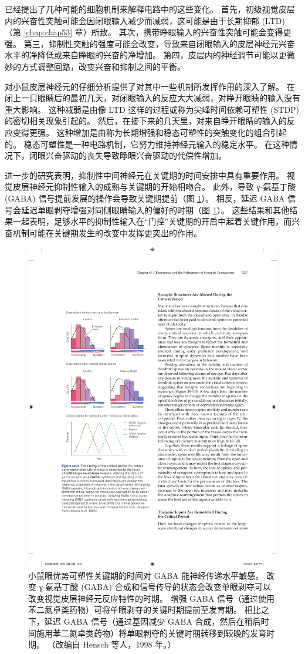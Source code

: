 已经提出了几种可能的细胞机制来解释电路中的这些变化。 首先，初级视觉皮层内的兴奋性突触可能会因闭眼输入减少而减弱，这可能是由于长期抑郁 (LTD)（第 \ref{chap:chap53} 章）所致。 其次，携带睁眼输入的兴奋性突触可能会变得更强。 第三，抑制性突触的强度可能会改变，导致来自闭眼输入的皮层神经元兴奋水平的净降低或来自睁眼的兴奋的净增加。 第四，皮层内的神经调节可能以更微妙的方式调整回路，改变兴奋和抑制之间的平衡。

对小鼠皮层神经元的仔细分析提供了对其中一些机制所发挥作用的深入了解。 在闭上一只眼睛后的最初几天，对闭眼输入的反应大大减弱，对睁开眼睛的输入没有重大影响。 这种减弱是由像 LTD 这样的过程或称为尖峰时间依赖可塑性 (STDP) 的密切相关现象引起的。 然后，在接下来的几天里，对来自睁开眼睛的输入的反应变得更强。 这种增加是由称为长期增强和稳态可塑性的突触变化的组合引起的。 稳态可塑性是一种电路机制，它努力维持神经元输入的稳定水平。 在这种情况下，闭眼兴奋驱动的丧失导致睁眼兴奋驱动的代偿性增加。

进一步的研究表明，抑制性中间神经元在关键期的时间安排中具有重要作用。 视觉皮层神经元抑制性输入的成熟与关键期的开始相吻合。 
此外，导致 γ-氨基丁酸 (GABA) 信号提前发展的操作会导致关键期提前（图 \ref{fig:49_9}）。
相反，延迟 GABA 信号会延迟单眼剥夺增强对同侧眼睛输入的偏好的时期（图 \ref{fig:49_9}）。 这些结果和其他结果一起表明，足够水平的抑制性输入在“门控”关键期的开启中起着关键作用，而兴奋机制可能在关键期发生的改变中发挥更突出的作用。

\begin{figure}[htbp]
	\centering
	\includegraphics[width=0.5\linewidth]{chap49/fig_49_9}
	\caption{小鼠眼优势可塑性关键期的时间对 GABA 能神经传递水平敏感。 改变 γ-氨基丁酸 (GABA) 合成和信号传导的状态会改变单眼剥夺可以改变视觉皮层神经元反应特性的时期。 增强 GABA 信号（通过使用苯二氮卓类药物）可将单眼剥夺的关键时期提前至发育期。 相比之下，延迟 GABA 信号（通过基因减少 GABA 合成，然后在稍后时间施用苯二氮卓类药物）将单眼剥夺的关键时期转移到较晚的发育时期。 （改编自 Hensch 等人，1998 年。）}
	\label{fig:49_9}
\end{figure}

